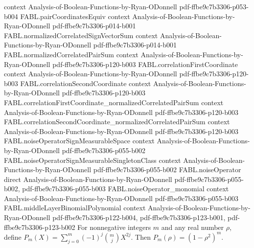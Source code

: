 \begin{theorem}
  {context}
  {Analysis-of-Boolean-Functions-by-Ryan-ODonnell}
  {pdf-ffbe9c7b3306-p053-b004}
\proofstep
  {FABL.pairCoordinatesEquiv}
  {context}
  {Analysis-of-Boolean-Functions-by-Ryan-ODonnell}
  {pdf-ffbe9c7b3306-p014-b001}
\proofstep
  {FABL.normalizedCorrelatedSignVectorSum}
  {context}
  {Analysis-of-Boolean-Functions-by-Ryan-ODonnell}
  {pdf-ffbe9c7b3306-p014-b001}
\proofstep
  {FABL.normalizedCorrelatedPairSum}
  {context}
  {Analysis-of-Boolean-Functions-by-Ryan-ODonnell}
  {pdf-ffbe9c7b3306-p120-b003}
\proofstep
  {FABL.correlationFirstCoordinate}
  {context}
  {Analysis-of-Boolean-Functions-by-Ryan-ODonnell}
  {pdf-ffbe9c7b3306-p120-b003}
\proofstep
  {FABL.correlationSecondCoordinate}
  {context}
  {Analysis-of-Boolean-Functions-by-Ryan-ODonnell}
  {pdf-ffbe9c7b3306-p120-b003}
\proofstep
  {FABL.correlationFirstCoordinate_normalizedCorrelatedPairSum}
  {context}
  {Analysis-of-Boolean-Functions-by-Ryan-ODonnell}
  {pdf-ffbe9c7b3306-p120-b003}
\proofstep
  {FABL.correlationSecondCoordinate_normalizedCorrelatedPairSum}
  {context}
  {Analysis-of-Boolean-Functions-by-Ryan-ODonnell}
  {pdf-ffbe9c7b3306-p120-b003}
\proofstep
  {FABL.noiseOperatorSignMeasurableSpace}
  {context}
  {Analysis-of-Boolean-Functions-by-Ryan-ODonnell}
  {pdf-ffbe9c7b3306-p055-b002}
\proofstep
  {FABL.noiseOperatorSignMeasurableSingletonClass}
  {context}
  {Analysis-of-Boolean-Functions-by-Ryan-ODonnell}
  {pdf-ffbe9c7b3306-p055-b002}
\proofstep
  {FABL.noiseOperator}
  {direct}
  {Analysis-of-Boolean-Functions-by-Ryan-ODonnell}
  {pdf-ffbe9c7b3306-p055-b002,
    pdf-ffbe9c7b3306-p055-b003}
\proofstep
  {FABL.noiseOperator_monomial}
  {context}
  {Analysis-of-Boolean-Functions-by-Ryan-ODonnell}
  {pdf-ffbe9c7b3306-p055-b003}
\proofstep
  {FABL.middleLayerBinomialPolynomial}
  {context}
  {Analysis-of-Boolean-Functions-by-Ryan-ODonnell}
  {pdf-ffbe9c7b3306-p122-b004,
    pdf-ffbe9c7b3306-p123-b001,
    pdf-ffbe9c7b3306-p123-b002}
For nonnegative integers $m$ and any real number $\rho$, define
$P_m(X)=\sum_{j=0}^{m}(-1)^j\binom{m}{j}X^{2j}$. Then $P_m(\rho)=(1-\rho^2)^m$.
\end{theorem}

